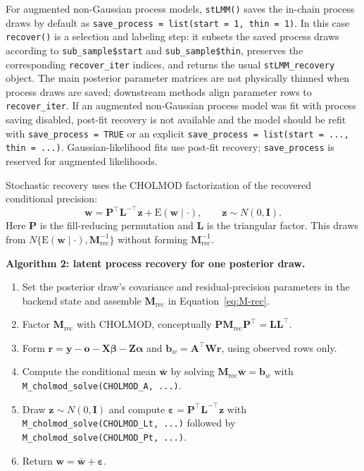 \documentclass[11pt]{article}
\newcommand{\by}{\bm{y}}
\newcommand{\bw}{\bm{w}}
\newcommand{\balpha}{\bm{\alpha}}
\newcommand{\bbeta}{\bm{\beta}}
\newcommand{\beps}{\bm{\varepsilon}}
\newcommand{\br}{\bm{r}}
\newcommand{\bz}{\bm{z}}
\newcommand{\bb}{\bm{b}}
\newcommand{\bo}{\bm{o}}
\newcommand{\bA}{\bm{A}}
\newcommand{\bI}{\bm{I}}
\newcommand{\bL}{\bm{L}}
\newcommand{\bM}{\bm{M}}
\newcommand{\bP}{\bm{P}}
\newcommand{\bW}{\bm{W}}
\newcommand{\bX}{\bm{X}}
\newcommand{\bZ}{\bm{Z}}
\newcommand{\trans}{^\top}
\begin{document}
For augmented non-Gaussian process models, \texttt{stLMM()} saves the in-chain process draws by default as \texttt{save\_process = list(start = 1, thin = 1)}. In this case \texttt{recover()} is a selection and labeling step: it subsets the saved process draws according to \texttt{sub\_sample\$start} and \texttt{sub\_sample\$thin}, preserves the corresponding \texttt{recover\_iter} indices, and returns the usual \texttt{stLMM\_recovery} object. The main posterior parameter matrices are not physically thinned when process draws are saved; downstream methods align parameter rows to \texttt{recover\_iter}. If an augmented non-Gaussian process model was fit with process saving disabled, post-fit recovery is not available and the model should be refit with \texttt{save\_process = TRUE} or an explicit \texttt{save\_process = list(start = ..., thin = ...)}. Gaussian-likelihood fits use post-fit recovery; \texttt{save\_process} is reserved for augmented likelihoods.

Stochastic recovery uses the CHOLMOD factorization of the recovered conditional precision:
\begin{equation}
  \label{eq:recover-stochastic}
  \bw = \bP\trans \bL^{-\top}\bz + \mathrm{E}(\bw \mid \cdot),
  \qquad \bz \sim N(0,\bI).
\end{equation}
Here $\bP$ is the fill-reducing permutation and $\bL$ is the triangular factor. This draws from $N\{\mathrm{E}(\bw\mid\cdot),\bM_{\mathrm{rec}}^{-1}\}$ without forming $\bM_{\mathrm{rec}}^{-1}$.

\begin{center}
\begin{minipage}{0.95\textwidth}
\textbf{Algorithm 2: latent process recovery for one posterior draw.}
\begin{enumerate}
\item Set the posterior draw's covariance and residual-precision parameters in the backend state and assemble $\bM_{\mathrm{rec}}$ in Equation~\eqref{eq:M-rec}.
\item Factor $\bM_{\mathrm{rec}}$ with CHOLMOD, conceptually $\bP\bM_{\mathrm{rec}}\bP\trans=\bL\bL\trans$.
\item Form $\br=\by-\bo-\bX\bbeta-\bZ\balpha$ and $\bb_w=\bA\trans\bW\br$, using observed rows only.
\item Compute the conditional mean $\bar{\bw}$ by solving $\bM_{\mathrm{rec}}\bar{\bw}=\bb_w$ with \texttt{M\_cholmod\_solve(CHOLMOD\_A, ...)}.
\item Draw $\bz\sim N(0,\bI)$ and compute $\beps=\bP\trans\bL^{-\top}\bz$ with \texttt{M\_cholmod\_solve(CHOLMOD\_Lt, ...)} followed by \texttt{M\_cholmod\_solve(CHOLMOD\_Pt, ...)}.
\item Return $\bw=\bar{\bw}+\beps$.
\end{enumerate}
\end{minipage}
\end{center}
\end{document}
